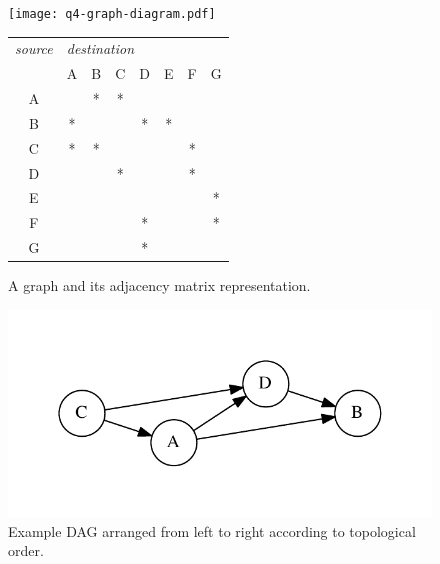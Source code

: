 \documentclass[a4paper]{article}
\begin{document}
\begin{figure}
  \centering
  \begin{minipage}{0.4\columnwidth}
    \texttt{[image: q4-graph-diagram.pdf]}
  \end{minipage}
  \begin{minipage}{0.45\columnwidth}
    \small
    \begin{tabular}{|*{8}{c|}}
      \hline
      \emph{source}
      &
      \multicolumn{7}{l|}{\emph{destination}} \\
        & A & B & C & D & E & F & G \\
      \hline
      A &   & * & * &   &   &   &   \\
      \hline
      B & * &   &   & * & * &   &   \\
      \hline
      C & * & * &   &   &   & * &   \\
      \hline
      D &   &   & * &   &   & * &   \\
      \hline
      E &   &   &   &   &   &   & * \\
      \hline
      F &   &   &   & * &   &   & * \\
      \hline
      G &   &   &   & * &   &   &   \\
      \hline
    \end{tabular}
  \end{minipage}
  \caption{A graph and its adjacency matrix representation.}\label{fig:a2}
\end{figure}

\begin{figure}
  \centering
  \includegraphics[width=0.35\columnwidth,trim=1cm 1cm 1cm 1cm]{dag-small.pdf}
  \caption{Example DAG arranged from left to right according to topological order.}\label{fig:topo-example}
\end{figure}
\end{document}
